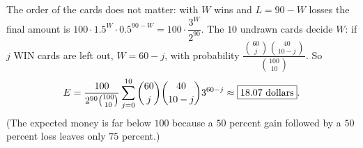 The order of the cards does not matter: with $W$ wins and $L=90-W$ losses the final amount is $100\cdot1.5^W\cdot0.5^{90-W}=100\cdot\dfrac{3^W}{2^{90}}$. The $10$ undrawn cards decide $W$: if $j$ WIN cards are left out, $W=60-j$, with probability $\dfrac{\binom{60}{j}\binom{40}{10-j}}{\binom{100}{10}}$. So
\[
E=\dfrac{100}{2^{90}\binom{100}{10}}\sum_{j=0}^{10}\dbinom{60}{j}\dbinom{40}{10-j}3^{60-j}\approx\boxed{18.07\text{ dollars}}.
\]
(The expected money is far below $100$ because a $50$ percent gain followed by a $50$ percent loss leaves only $75$ percent.)
